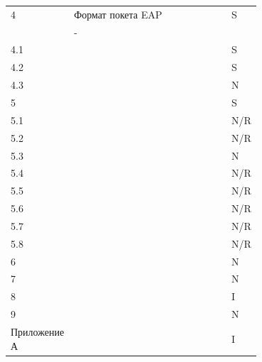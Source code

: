 \begin{longtable}{|l|p{0.7\linewidth}|l|}
   \hline
   4 & Формат покета EAP & S \\
   & -  & \\
   \hline
   4.1 & & S \\
   \hline
   4.2 & & S \\
   \hline
   4.3 & & N \\
   \hline
   5 & & S \\
   \hline
   5.1 & & N/R \\
   \hline
   5.2 & & N/R \\
   \hline
   5.3 & & N \\
   \hline
   5.4 & & N/R \\
   \hline
   5.5 & & N/R \\
   \hline
   5.6 & & N/R \\
   \hline
   5.7 & & N/R \\
   \hline 
   5.8 & & N/R \\
   \hline
   6 & & N \\
   \hline
   7 & & N \\
   \hline
   8 & & I \\
   \hline
   9 & & N \\
   \hline
   Приложение А & & I \\
   \hline    
\end{longtable}
